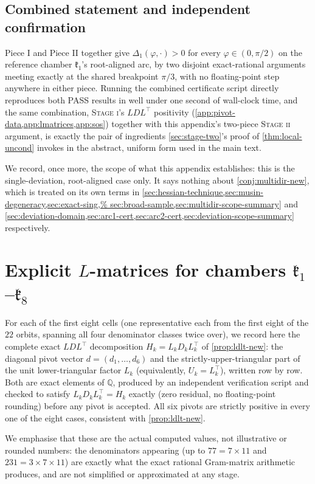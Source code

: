 \documentclass[11pt,reqno]{amsart}
\renewcommand{\_}{\origunderscore\allowbreak}
\numberwithin{equation}{section}
\theoremstyle{plain}
\theoremstyle{definition}
\theoremstyle{remark}
\newcommand{\Cell}[1]{\mathfrak{k}_{#1}}     %
\newcommand{\tilt}{\varphi}                  %
\newcommand{\defect}{\Delta}                 %
\newcommand{\stageone}{\textnormal{\scshape Stage i}}
\newcommand{\stagetwo}{\textnormal{\scshape Stage ii}}
\begin{document}
\subsection*{Combined statement and independent confirmation}

Piece I and Piece II together give $\defect_1(\tilt,\cdot)>0$ for every
$\tilt\in(0,\pi/2)$ on the reference chamber $\Cell1$'s root-aligned
arc, by two disjoint exact-rational arguments meeting exactly at the
shared breakpoint $\pi/3$, with no floating-point step anywhere in
either piece. Running the combined certificate script directly
reproduces both PASS results in well under one second of wall-clock
time, and the same combination, \stageone's $LDL^\top$ positivity
(\cref{app:pivot-data,app:lmatrices,app:sos}) together with this
appendix's two-piece \stagetwo{} argument, is exactly the pair of
ingredients \cref{sec:stage-two}'s proof of \cref{thm:local-uncond}
invokes in the abstract, uniform form used in the main text.

We record, once more, the scope of what this appendix establishes:
this is the single-deviation, root-aligned case only. It says nothing
about \cref{conj:multidir-new}, which is treated on its own terms in
\cref{sec:hessian-technique,sec:musin-degeneracy,sec:exact-sing,%
sec:broad-sample,sec:multidir-scope-summary} and
\cref{sec:deviation-domain,sec:arc1-cert,sec:arc2-cert,sec:deviation-scope-summary}
respectively.
\section{Explicit \texorpdfstring{$L$}{L}-matrices for chambers \texorpdfstring{$\Cell1$--$\Cell8$}{C001--C008}}\label{app:lmatrices}

For each of the first eight cells (one representative each from the
first eight of the $22$ orbits, spanning all four denominator classes
twice over), we record here the complete exact $LDL^\top$ decomposition
$H_k=L_kD_kL_k^\top$ of \cref{prop:ldlt-new}: the diagonal pivot vector
$d=(d_1,\dots,d_6)$ and the strictly-upper-triangular part of the
unit lower-triangular factor $L_k$ (equivalently, $U_k=L_k^\top$),
written row by row. Both are exact elements of $\mathbb{Q}$, produced
by an independent verification script and checked to satisfy
$L_kD_kL_k^\top=H_k$ exactly (zero residual, no floating-point
rounding) before any pivot is accepted. All six pivots are strictly
positive in every one of the eight cases, consistent with
\cref{prop:ldlt-new}.

We emphasise that these are the actual computed values, not
illustrative or rounded numbers: the denominators appearing (up to
$77=7\times11$ and $231=3\times7\times11$) are exactly what the exact
rational Gram-matrix arithmetic produces, and are not simplified or
approximated at any stage.
\end{document}
